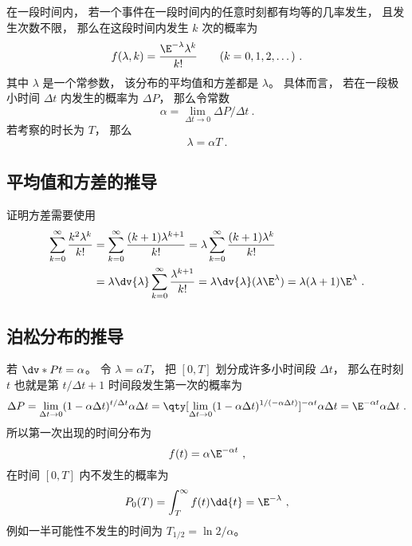 

在一段时间内， 若一个事件在一段时间内的任意时刻都有均等的几率发生， 且发生次数不限， 那么在这段时间内发生 $k$ 次的概率为
\begin{equation}
f(\lambda, k) = \frac{\E^{-\lambda}\lambda^k}{k!} \qquad (k = 0,1,2,\dots)~.
\end{equation}
其中 $\lambda$ 是一个常参数， 该分布的平均值和方差都是 $\lambda$。 具体而言， 若在一段极小时间 $\Delta t$ 内发生的概率为 $\Delta P$， 那么令常数
\begin{equation}
\alpha = \lim_{\Delta t\to 0}\Delta P/\Delta t~.
\end{equation}
若考察的时长为 $T$， 那么
\begin{equation}
\lambda = \alpha T~.
\end{equation}

\subsection{平均值和方差的推导}
证明方差需要使用
\begin{equation}
\begin{aligned}
\sum_{k=0}^\infty \frac{k^2\lambda^{k}}{k!}
&= \sum_{k=0}^\infty \frac{(k+1)\lambda^{k+1}}{k!}
= \lambda \sum_{k=0}^\infty \frac{(k+1)\lambda^k}{k!}\\
&= \lambda\dv{\lambda} \sum_{k=0}^\infty \frac{\lambda^{k+1}}{k!}
= \lambda \dv{\lambda} (\lambda \E^{\lambda})
= \lambda(\lambda+1)\E^{\lambda}~.
\end{aligned}
\end{equation}

\subsection{泊松分布的推导}
若 $\dv*{P}{t} = \alpha$。 令 $\lambda = \alpha T$， 把 $[0,T]$ 划分成许多小时间段 $\Delta t$， 那么在时刻 $t$ 也就是第 $t/\Delta t+1$ 时间段发生第一次的概率为
\begin{equation}
\Delta P = \lim_{\Delta t\to 0}(1 - \alpha\Delta t)^{t/\Delta t} \alpha\Delta t
= \qty[\lim_{\Delta t\to 0}(1 - \alpha\Delta t)^{1/(-\alpha\Delta t)}]^{-\alpha t} \alpha\Delta t
= \E^{-\alpha t} \alpha \Delta t~.
\end{equation}
所以第一次出现的时间分布为
\begin{equation}
f(t) = \alpha\E^{-\alpha t}~,
\end{equation}
在时间 $[0,T]$ 内不发生的概率为
\begin{equation}
P_0(T) = \int_{T}^\infty f(t) \dd{t} = \E^{-\lambda}~,
\end{equation}
例如一半可能性不发生的时间为 $T_{1/2} = \ln 2/\alpha$。

